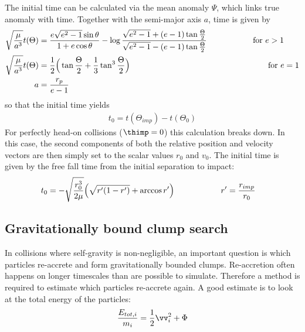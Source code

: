 The initial time can be calculated via the mean anomaly $\Psi$, which links true anomaly with time. Together with the semi-major axis $a$, time is given by
\begin{align}
\label{ch02_aux_eq011}
\sqrt{\frac{\mu}{a^3} } t(\Theta) &=  \frac{e \sqrt{e^2-1} \sin{\theta} }{1 + e \cos{\theta}} - \log{\frac{\sqrt{e^2-1} + (e - 1) \tan{\frac{\Theta}{2}} }{  \sqrt{e^2-1} - (e - 1) \tan{\frac{\Theta}{2}} } } \hspace{2.0cm} \text{for~} e > 1\\
\sqrt{\frac{\mu}{a^3} } t(\Theta) &=  \frac{1}{2} \Big( \tan{\frac{\Theta}{2}} + \frac{1}{3} \tan^3{\frac{\Theta}{2}}\Big) \hspace{6.0cm} \text{for~} e = 1\\
a &= \frac{r_p}{e - 1} 
\end{align}
so that the initial time yields
\begin{align}
\label{ch02_aux_eq012}
t_0 = t(\Theta_{imp}) -  t(\Theta_0)
\end{align}
For perfectly head-on collisions ($\thimp = 0$) this calculation breaks down. In this case, the second components of both the relative position and velocity vectors are then simply set to the scalar values $r_0$ and $v_0$. The initial time is given by the free fall time from the initial separation to impact:
\begin{align}
\label{ch02_aux_eq013}
t_0 &= -\sqrt{\frac{r_0^3}{2 \mu}} \Big( \sqrt{r' (1-r')} + \arccos{r'} \Big) \hspace{2.0cm} r' = \frac{r_{imp}}{r_0}
\end{align}

\subsection{Gravitationally bound clump search}
In collisions where self-gravity is non-negligible, an important question is which particles re-accrete and form gravitationally bounded clumps. Re-accretion often happens on longer timescales than are possible to simulate. Therefore a method is required to estimate which particles re-accrete again. A good estimate is to look at the total energy of the particles:
\begin{align}
\label{ch02_aux_eq014}
\frac{E_{tot,i}}{m_i} = \frac{1}{2} \vv_i^2 + \Phi
\end{align}

